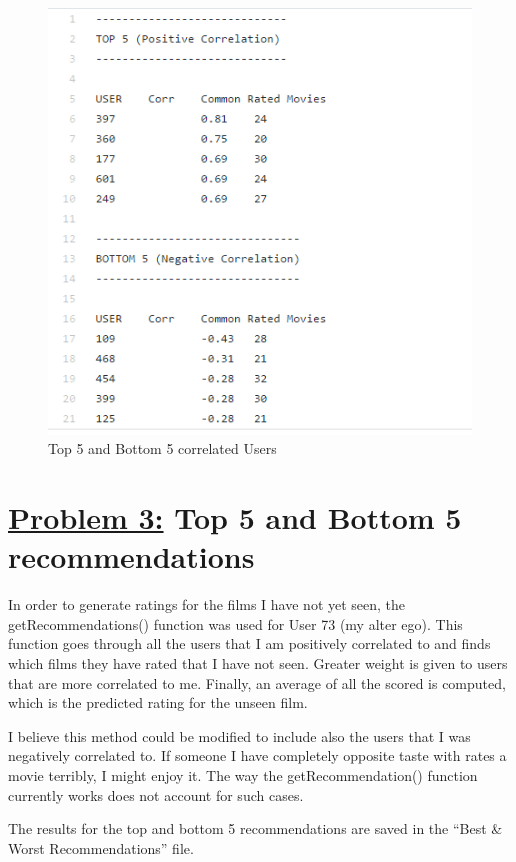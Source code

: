 \documentclass{article}
\begin{document}
\begin{figure}[H]
 \centering
 	\includegraphics[height=10 cm]{p2results.png}
  \caption{Top 5 and Bottom 5 correlated Users}
\end{figure}

\vspace{20 pt}

\section*{{\underline{\huge {Problem 3:}} Top 5 and Bottom 5 recommendations}}
In order to generate ratings for the films I have not yet seen, the getRecommendations() function was used for User 73 (my alter ego). This function goes through all the users that I am positively correlated to and finds which films they have rated that I have not seen. Greater weight is given to users that are more correlated to me. Finally, an average of all the scored is computed, which is the predicted rating for the unseen film.

I believe this method could be modified to include also the users that I was negatively correlated to. If someone I have completely opposite taste with rates a movie terribly, I might enjoy it. The way the getRecommendation() function currently works does not account for such cases.

The results for the top and bottom 5 recommendations are saved in the ``Best \& Worst Recommendations'' file.
\end{document}
